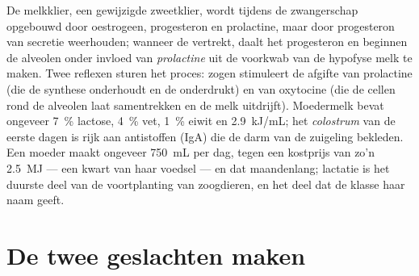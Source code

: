 \begin{proposition}[Lactatie]\label{prop:b2:mammal-reproduction:lactation}
De melkklier, een gewijzigde zweetklier, wordt tijdens de zwangerschap
opgebouwd door oestrogeen, progesteron en prolactine, maar door progesteron
van secretie weerhouden; wanneer de  vertrekt, daalt het
progesteron en beginnen de alveolen onder invloed van \emph{prolactine} uit
de voorkwab van de hypofyse melk te maken. Twee reflexen sturen het proces:
zogen stimuleert de afgifte van prolactine (die de synthese onderhoudt en
de  onderdrukt) en van oxytocine (die de cellen rond de alveolen
laat samentrekken en de melk uitdrijft). Moedermelk bevat ongeveer
\qty{7}{\%} lactose, \qty{4}{\%} vet, \qty{1}{\%} eiwit en
\qty{2.9}{kJ/mL}; het \emph{colostrum} van de eerste dagen is rijk aan
antistoffen (IgA) die de darm van de zuigeling bekleden. Een moeder maakt
ongeveer \qty{750}{mL} per dag, tegen een kostprijs van zo'n \qty{2.5}{MJ}
--- een kwart van haar voedsel --- en dat maandenlang; lactatie is het
duurste deel van de voortplanting van zoogdieren, en het deel dat de
klasse haar naam geeft.
\end{proposition}

\section{De twee geslachten maken}

